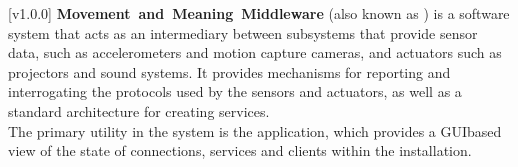 [v1.0.0]
\textbf{Movement~and~Meaning~Middleware} (also known as \mplusm) is a software system
that acts as an intermediary between subsystems that provide sensor data, such as
accelerometers and motion capture cameras, and actuators such as projectors and sound
systems.
It provides mechanisms for reporting and interrogating the protocols used by the sensors
and actuators, as well as a standard architecture for creating services.\\

The primary utility in the \mplusm{} system is the \emph{\MMMU} application, which
provides a GUI\longDash{}based view of the state of connections, services and clients
within the installation.
\primaryEnd{}
